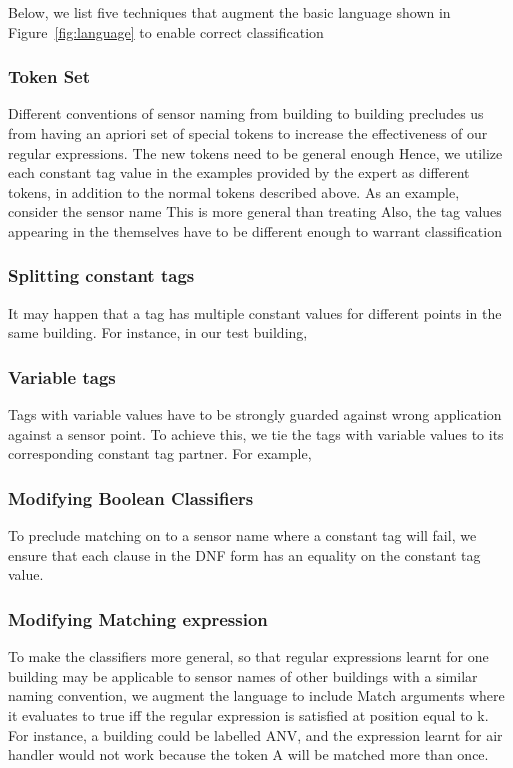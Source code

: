 Below, we list five techniques that augment the basic language shown in Figure~\ref{fig:language} to enable correct classification 

\subsubsection{Token Set}

Different conventions of sensor naming from building to building precludes us from having an apriori set of special tokens to increase the effectiveness of our regular expressions. The new tokens need to be general enough Hence, we utilize  each constant tag value in the examples provided by the expert as different tokens, in addition to the normal tokens described above. 
As an example, consider the sensor name 
This is more general than treating 
Also, the tag values appearing in the themselves have to be different enough to warrant classification


\subsubsection{Splitting constant tags}

It may happen that a tag has multiple constant values for different points in the same building. For instance, in our test building, 


\subsubsection{Variable tags}
Tags with variable values have to be strongly guarded against wrong application against a sensor point. To achieve this, we tie the tags with variable values to its corresponding constant tag partner. For example,  


\subsubsection{Modifying Boolean Classifiers}
To preclude matching on to a sensor name where a constant tag will fail, we ensure that each clause in the DNF form has an equality on the constant tag value. 



\subsubsection{Modifying Matching expression}
To make the classifiers more general, so that regular expressions learnt for one building may be applicable to sensor names of other buildings with a similar naming convention, we augment the language to include Match arguments where it evaluates to true iff the regular expression is satisfied at position equal to k. For instance, a building could be labelled ANV, and the expression learnt for air handler would not work because the token A will be matched more than once. 





